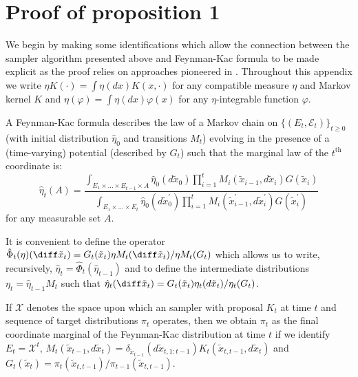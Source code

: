 \section{Proof of proposition 1}
\label{sec:Proof of proposition 1}

We begin by making some identifications which allow the connection between the
\smc sampler algorithm presented above and Feynman-Kac formula to be made
explicit as the proof relies on approaches pioneered in
\cite{DelMoral:2004ux}. Throughout this appendix we write $\eta K(\cdot) =
\int \eta(dx) K(x,\cdot)$ for any compatible measure $\eta$ and Markov kernel
$K$ and $\eta(\varphi) = \int \eta(dx) \varphi(x)$ for any $\eta$-integrable
function $\varphi$.

A Feynman-Kac formula describes the law of a Markov chain on
$\{(E_t,\mathcal{E}_t)\}_{t\geq 0}$ (with initial distribution
$\hat\eta_0$ and transitions $M_t$) evolving in the presence of a
(time-varying) potential (described by $G_t$) such that the marginal law of
the $t^\text{th}$ coordinate is:
\begin{equation*}
  \hat\eta_t(A) = \frac
  {
    \int_{E_1 \times \ldots \times E_{t-1} \times A}
    \hat\eta_0(d\tilde{x}_0)
    \prod_{i=1}^t M_{i}(\tilde{x}_{i-1},d\tilde{x}_i)
    G(\tilde{x}_i)
  }{
    \int_{E_1 \times \ldots \times E_{t}}
    \hat\eta_0(d\tilde{x}^\prime_0)
    \prod_{i=1}^t M_{i}(\tilde{x}^\prime_{i-1},d\tilde{x}^\prime_i)
    G(\tilde{x}^\prime_i)
  }
\end{equation*}
for any measurable set $A$.

It is convenient to define the operator $\hat\Phi_t(\eta)(\diff
\tilde{x}_t) = G_t(\tilde{x}_t)\eta M_t(\diff \tilde{x}_t)/\eta
M_t(G_t)$ which allows us to write, recursively, $\hat\eta_t =
\hat\Phi_t(\hat\eta_{t-1})$ and to define the intermediate
distributions $\eta_t = \hat\eta_{t-1}M_t$ such that $\hat\eta_t(\diff
\tilde{x}_t) = G_t(\tilde{x}_t) \eta_t(d\tilde{x}_t) /
\eta_t(G_t)$.

If $\mathcal{X}$ denotes the space upon which an \smc sampler with \mcmc
proposal $K_t$ at time $t$ and sequence of target distributions $\pi_t$
operates, then we obtain $\pi_t$ as the final coordinate marginal of the
Feynman-Kac distribution at time $t$ if we identify $E_t = \mathcal{X}^t$,
$M_{t}(\tilde{x}_{t-1},d\tilde{x}_t) =
\delta_{\tilde{x}_{t-1}}(d\tilde{x}_{t,1:t-1})
K_t(\tilde{x}_{t,t-1},d\tilde{x}_t)$ and $G_t(\tilde{x}_t) =
\pi_{t}(\tilde{x}_{t,t-1}) / \pi_{t-1}(\tilde{x}_{t,t-1})$.

